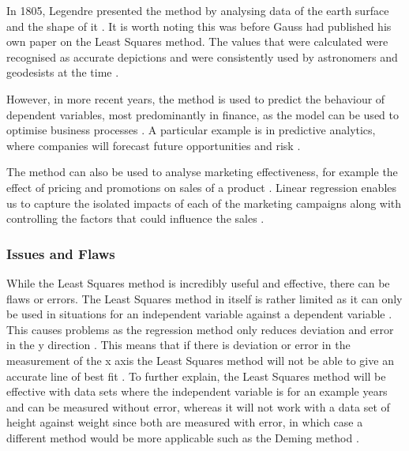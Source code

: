 \documentclass{article}
\begin{document}
In 1805, Legendre presented the method by analysing data of the earth surface and the shape of it \cite{sea}. It is worth noting this was before Gauss had published his own paper on the Least Squares method. The values that were calculated were recognised as accurate depictions and were consistently used by astronomers and geodesists at the time \cite{sea}.

However, in more recent years, the method is used to predict the behaviour of dependent variables, most predominantly in finance, as the model can be used to optimise business processes \cite{application}. A particular example is in predictive analytics, where companies will forecast future opportunities and risk \cite{application}. 

The method can also be used to analyse marketing effectiveness, for example the effect of pricing and promotions on sales of a product \cite{application}. Linear regression enables us to capture the isolated impacts of each of the marketing campaigns along with controlling the factors that could influence the sales \cite{application}. 

\subsubsection{Issues and Flaws}
While the Least Squares method is incredibly useful and effective, there can be flaws or errors. The Least Squares method in itself is rather limited as it can only be used in situations for an independent variable against a dependent variable \cite{flaws}. This causes problems as the regression method only reduces deviation and error in the y direction \cite{pitfall}. This means that if there is deviation or error in the measurement of the x axis the Least Squares method will not be able to give an accurate line of best fit \cite{pitfall}. To further explain, the Least Squares method will be effective with data sets where the independent variable is for an example years and can be measured without error, whereas it will not work with a data set of height against weight since both are measured with error, in which case a different method would be more applicable such as the Deming method \cite{pitfall}.
\end{document}
